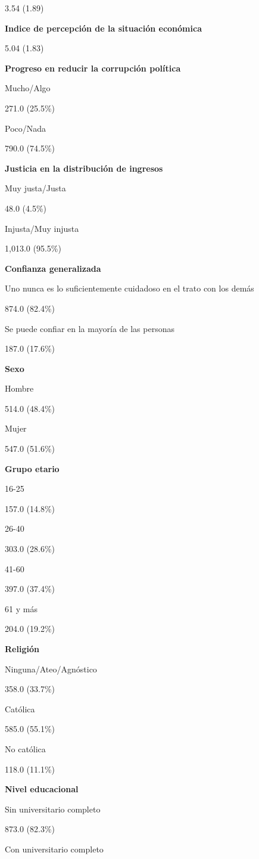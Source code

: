\documentclass[12pt,twoside]{templates/facsothesis}
\begin{document}
3.54 (1.89)

\textbf{Indice de percepción de la situación económica}

5.04 (1.83)

\textbf{Progreso en reducir la corrupción política}

Mucho/Algo

271.0 (25.5\%)

Poco/Nada

790.0 (74.5\%)

\textbf{Justicia en la distribución de ingresos}

Muy justa/Justa

48.0 (4.5\%)

Injusta/Muy injusta

1,013.0 (95.5\%)

\textbf{Confianza generalizada}

Uno nunca es lo suficientemente cuidadoso en el trato con los demás

874.0 (82.4\%)

Se puede confiar en la mayoría de las personas

187.0 (17.6\%)

\textbf{Sexo}

Hombre

514.0 (48.4\%)

Mujer

547.0 (51.6\%)

\textbf{Grupo etario}

16-25

157.0 (14.8\%)

26-40

303.0 (28.6\%)

41-60

397.0 (37.4\%)

61 y más

204.0 (19.2\%)

\textbf{Religión}

Ninguna/Ateo/Agnóstico

358.0 (33.7\%)

Católica

585.0 (55.1\%)

No católica

118.0 (11.1\%)

\textbf{Nivel educacional}

Sin universitario completo

873.0 (82.3\%)

Con universitario completo
\end{document}
